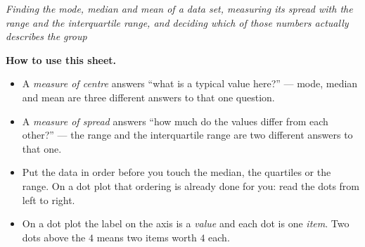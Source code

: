 \documentclass[12pt]{article}
\begin{document}

\begin{center}\small\textit{Finding the mode, median and mean of a data set, measuring its
spread with the range and the interquartile range, and deciding which of those numbers
actually describes the group}\end{center}

\noindent\small\textbf{How to use this sheet.}
\begin{itemize}[label={$\bullet$}, leftmargin=1.1cm, itemsep=1pt, topsep=2pt]
  \item A \emph{measure of centre} answers ``what is a typical value here?'' --- mode, median
        and mean are three different answers to that one question.
  \item A \emph{measure of spread} answers ``how much do the values differ from each other?''
        --- the range and the interquartile range are two different answers to that one.
  \item Put the data in order before you touch the median, the quartiles or the range. On a
        dot plot that ordering is already done for you: read the dots from left to right.
  \item On a dot plot the label on the axis is a \emph{value} and each dot is one
        \emph{item}. Two dots above the $4$ means two items worth $4$ each.
\end{itemize}
\normalsize

\bigskip

\end{document}
